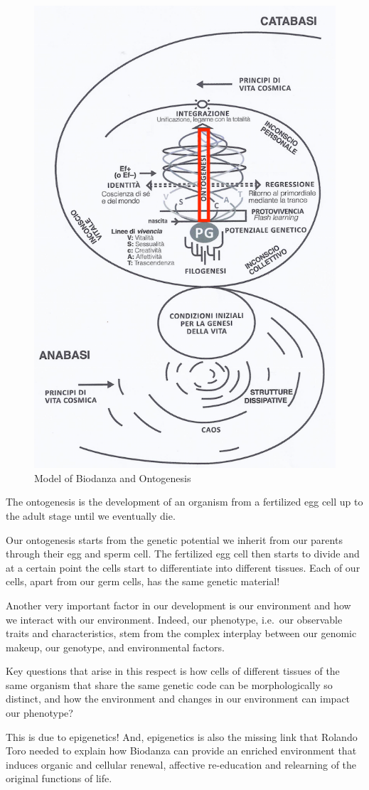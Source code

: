 \documentclass[
  11pt,
]{book}
\begin{document}
\begin{figure}

{\centering \includegraphics[width=0.5\linewidth]{./figs/biologischeAspectenBiodanzaDeelIII} 

}

\caption{Model of Biodanza and Ontogenesis}\label{fig:modelOnto}
\end{figure}

The ontogenesis is the development of an organism from a fertilized egg cell up to the adult stage until we eventually die.

Our ontogenesis starts from the genetic potential we inherit from our parents through their egg and sperm cell. The fertilized egg cell then starts to divide and at a certain point the cells start to differentiate into different tissues.
Each of our cells, apart from our germ cells, has the same genetic material!

Another very important factor in our development is our environment and how we interact with our environment.
Indeed, our phenotype, i.e.~our observable traits and characteristics, stem from the complex interplay between our genomic makeup, our genotype, and environmental factors.

Key questions that arise in this respect is how cells of different tissues of the same organism that share the same genetic code can be morphologically so distinct, and how the environment and changes in our environment can impact our phenotype?

This is due to epigenetics! And, epigenetics is also the missing link that Rolando Toro needed to explain how Biodanza can provide an enriched environment that induces organic and cellular renewal, affective re-education and relearning of the original functions of life.
\end{document}
